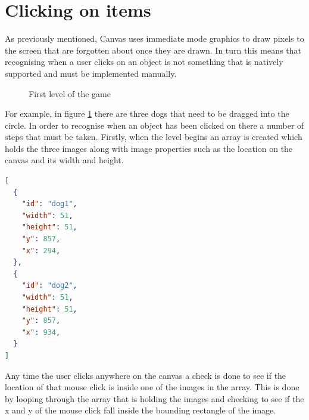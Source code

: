 \documentclass[12pt,a4paper]{report}
\begin{document}
\section{Clicking on items} \label{Clicking on items}
As previously mentioned, Canvas uses immediate mode graphics to draw pixels to the screen that are forgotten about once they are drawn. In turn this means that recognising when a user clicks on an object is not something that is natively supported and must be implemented manually. 

\begin{figure}[h]
  \centering
  \begin{minipage}[b]{1\textwidth}
    \caption{First level of the game}
    \label{fig:selectDogs}
  \end{minipage}
\end{figure}
\FloatBarrier

For example, in figure \ref{fig:selectDogs} there are three dogs that need to be dragged into the circle. In order to recognise when an object has been clicked on there a number of steps that must be taken. Firstly, when the level begins an array is created which holds the three images along with image properties such as the location on the canvas and its width and height.

\begin{minipage}{\linewidth}
\begin{lstlisting}[language=json]
[
  {
    "id": "dog1",
    "width": 51,
    "height": 51,
    "y": 857,
    "x": 294,
  },
  {
    "id": "dog2",
    "width": 51,
    "height": 51,
    "y": 857,
    "x": 934,
  }
]
\end{lstlisting}
\end{minipage}

Any time the user clicks anywhere on the canvas a check is done to see if the location of that mouse click is inside one of the images in the array.
This is done by looping through the array that is holding the images and checking to see if the x and y of the mouse click fall inside the bounding rectangle of the image.
\end{document}
